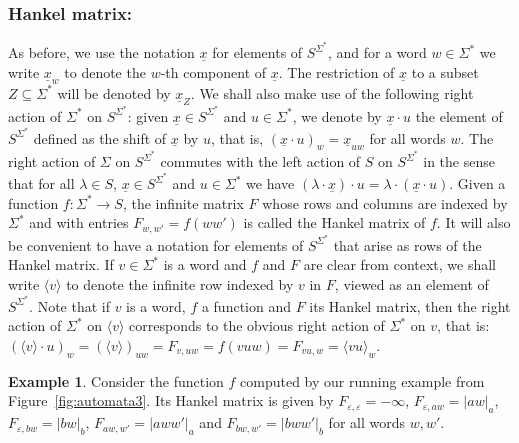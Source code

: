 \documentclass[10pt,a4paper]{amsart}
\theoremstyle{definition}
\newtheorem{exa}[thm]{Example}
\numberwithin{equation}{section}
\numberwithin{theorem}{section}
\begin{document}
\subsubsection*{\textbf{Hankel matrix:}} As before, 
 we use the notation $\underline{x}$ for elements of $S^{\Sigma^*}$, and for a word $w \in \Sigma^*$ we write $\underline{x}_w$ to denote the $w$-th component of $\underline{x}$. The restriction of $\underline{x}$ to a subset $Z \subseteq \Sigma^*$ will be denoted by $\underline{x}_Z$. We shall also make use of the following right action of $\Sigma^*$ on $S^{\Sigma^*}$: given $\underline{x} \in S^{\Sigma^*}$ and $u \in \Sigma^*$, we denote by $\underline{x}\cdot u$ the element of $S^{\Sigma^*}$ defined as the shift of $\underline{x}$ by $u$, that is, $(\underline{x}\cdot u)_w = \underline{x}_{uw}$ for all words $w$. The right action of $\Sigma$ on $S^{\Sigma^*}$ commutes with the left action of $S$ on $S^{\Sigma^*}$ in the sense that for all $\lambda \in S$, $\underline{x} \in S^{\Sigma^*}$ and $u \in \Sigma^*$ we have $(\lambda \cdot \underline{x}) \cdot u = \lambda \cdot (\underline{x} \cdot u)$. Given a function $f: \Sigma^* \to S$, the infinite matrix $F$ whose rows and columns are indexed by $\Sigma^*$ and with entries $F_{w,w'} = f(ww')$ is called the Hankel matrix of $f$.  It will also be convenient to have a notation for elements of $S^{\Sigma^*}$ that arise as rows of the Hankel matrix. If $v \in \Sigma^*$ is a word and $f$ and $F$ are clear from context, we shall write $\langle v \rangle$ to denote the infinite row indexed by $v$ in $F$, viewed as an element of $S^{\Sigma^*}$. Note that if $v$ is a word, $f$ a function and $F$ its Hankel matrix, then the right action of $\Sigma^*$ on $\langle v \rangle$ corresponds to the obvious right action of $\Sigma^*$ on $v$, that is: $(\langle v \rangle \cdot u)_w = (\langle v \rangle)_{uw}  = F_{v,uw} = f(vuw) = F_{vu,w} =\langle vu \rangle_{w}$. 

\begin{exa}
Consider the function $f$ computed by our running example from Figure~\ref{fig:automata3}. Its Hankel matrix is given by $F_{\varepsilon, \varepsilon} = -\infty$, $F_{\varepsilon, aw} = |aw|_a$, $F_{\varepsilon, bw} = |bw|_b$, $F_{aw, w'} = |aww'|_a$ and $F_{bw, w'} = |bww'|_b$ for all words $w,w'$.    
\end{exa}
\end{document}
